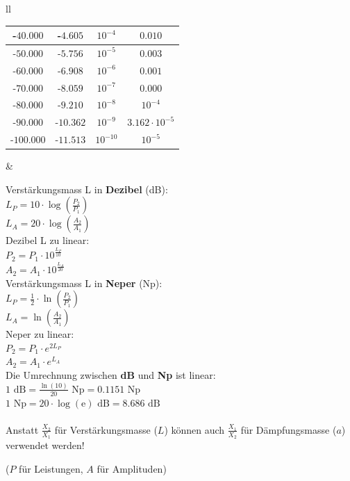 \begin{tabular}{ll}
{\begin{tabular}{|c|c|c|c|}
    -$40.000$ & -$4.605$ & $10^{-4}$ & $0.010$ \\ \hline
    -$50.000$ & -$5.756$ & $10^{-5}$ & $0.003$ \\ \hline
    -$60.000$ & -$6.908$ & $10^{-6}$ & $0.001$ \\ \hline
    -$70.000$ & -$8.059$ & $10^{-7}$ & $0.000$ \\ \hline
    -$80.000$ & -$9.210$ & $10^{-8}$ & $10^{-4}$ \\ \hline
    -$90.000$ & -$10.362$ & $10^{-9}$ & $3.162 \cdot 10^{-5}$ \\ \hline
    -$100.000$ & -$11.513$ & $10^{-10}$ & $10^{-5}$ \\ \hline
    \end{tabular}
    \renewcommand{\arraystretch}{1.0}

    \normalsize
}
& \parbox{11.5cm}{
Verstärkungsmass L in \textbf{Dezibel} (dB):\\
$L_P = 10 \cdot \log \left(\frac {P_2} {P_1}\right)$ \\
$L_A = 20 \cdot \log \left(\frac {A_2} {A_1}\right)$ \\ 

Dezibel L zu linear: \\
$P_2 = P_1 \cdot 10^{\frac{L_P}{10}} $ \\
$A_2 = A_1 \cdot 10^{\frac{L_A}{20}} $ \\

Verstärkungsmass L in \textbf{Neper} (Np):\\
$L_P = \frac {1}{2} \cdot \ln \left(\frac {P_2} {P_1}\right)$\\
$L_A = \ln \left(\frac {A_2} {A_1} \right)$ \\

Neper zu linear: \\
$P_2 = P_1 \cdot e^{2 L_P}$ \\
$A_2 = A_1 \cdot e^{L_A}$ \\

Die Umrechnung zwischen {\bf dB} und {\bf Np} ist linear: \\
$1\mbox{~dB} = \frac {\ln(10)} {20} \mbox{~Np} = 0.1151\mbox{~Np}$ \\
$1\mbox{~Np} = 20 \cdot \log(\mbox{e}) \mbox{~dB} = 8.686\mbox{~dB}$ \\ 
\\
Anstatt $\frac{X_2}{X_1}$ für Verstärkungsmasse ($L$) können auch
$\frac{X_1}{X_2}$ für Dämpfungsmasse ($a$) verwendet werden!

\small{($P$ für Leistungen, $A$ für Amplituden)}
\\ \\ \\

}
\end{tabular}

